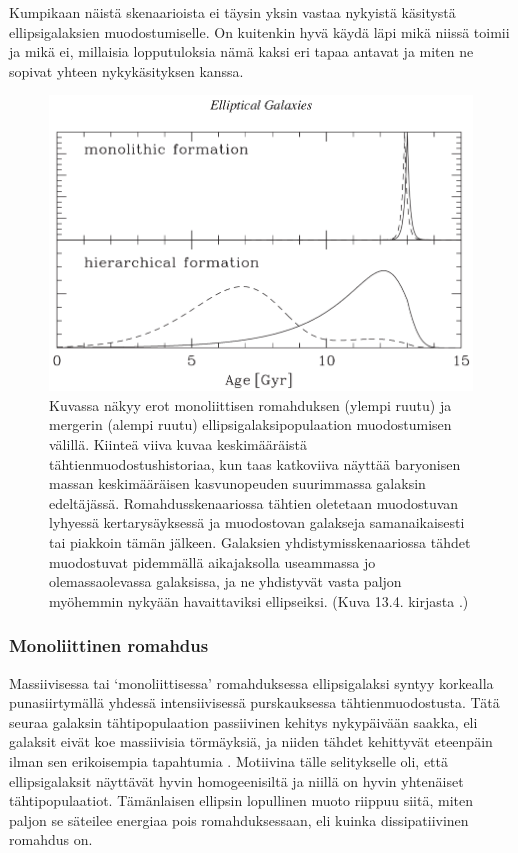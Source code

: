 \documentclass[12pt,a4paper]{article}
\begin{document}
Kumpikaan näistä skenaarioista ei täysin yksin vastaa nykyistä käsitystä ellipsigalaksien muodostumiselle. On kuitenkin hyvä käydä läpi mikä niissä toimii ja mikä ei, millaisia lopputuloksia nämä kaksi eri tapaa antavat ja miten ne sopivat yhteen nykykäsityksen kanssa.

\begin{figure}[h!tb]
\centering
\includegraphics[width=\textwidth]{../kuvat/formation.png}
\caption{Kuvassa näkyy erot monoliittisen romahduksen (ylempi ruutu) ja mergerin (alempi ruutu) ellipsigalaksipopulaation muodostumisen välillä. Kiinteä viiva kuvaa keskimääräistä tähtienmuodostushistoriaa, kun taas katkoviiva näyttää baryonisen massan keskimääräisen kasvunopeuden suurimmassa galaksin edeltäjässä. Romahdusskenaariossa tähtien oletetaan muodostuvan lyhyessä kertarysäyksessä ja muodostovan galakseja samanaikaisesti tai piakkoin tämän jälkeen. Galaksien yhdistymisskenaariossa tähdet muodostuvat pidemmällä aikajaksolla useammassa jo olemassaolevassa galaksissa, ja ne yhdistyvät vasta paljon myöhemmin nykyään havaittaviksi ellipseiksi. (Kuva 13.4. kirjasta \cite{galform}.)}
\label{fig:muodostus}
\end{figure}

\subsubsection{Monoliittinen romahdus}

Massiivisessa tai `monoliittisessa' romahduksessa ellipsigalaksi syntyy korkealla punasiirtymällä yhdessä intensiivisessä purskauksessa tähtienmuodostusta. Tätä seuraa galaksin tähtipopulaation passiivinen kehitys nykypäivään saakka, eli galaksit eivät koe massiivisia törmäyksiä, ja niiden tähdet kehittyvät eteenpäin ilman sen erikoisempia tapahtumia \citep{partridge:1967, larson:1975}. Motiivina tälle selitykselle oli, että ellipsigalaksit näyttävät hyvin homogeenisiltä ja niillä on hyvin yhtenäiset tähtipopulaatiot. Tämänlaisen ellipsin lopullinen muoto riippuu siitä, miten paljon se säteilee energiaa pois romahduksessaan, eli kuinka dissipatiivinen romahdus on.
\end{document}
